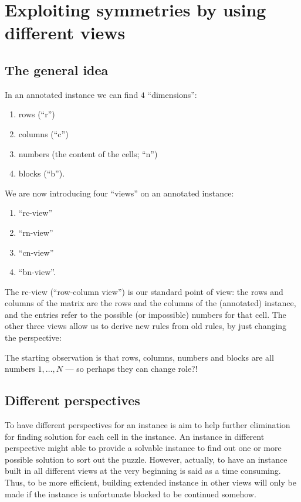 \documentclass[11pt]{report}
\begin{document}
\chapter{Exploiting symmetries by using different views}
\label{cha:exploitingsymm}


\section{The general idea}
\label{sec:diffviewsidea}

In an annotated instance we can find $4$ ``dimensions'':
\begin{enumerate}
\item rows (``r'')
\item columns (``c'')
\item numbers (the content of the cells; ``n'')
\item blocks (``b'').
\end{enumerate}
We are now introducing four ``views'' on an annotated instance:
\begin{enumerate}
\item ``rc-view''
\item ``rn-view''
\item ``cn-view''
\item ``bn-view''.
\end{enumerate}
The rc-view (``row-column view'') is our standard point of view: the rows and columns of the matrix are the rows and the columns of the (annotated) instance, and the entries refer to the possible (or impossible) numbers for that cell. The other three views allow us to derive new rules from old rules, by just changing the perspective:
\begin{center}
The starting observation is that rows, columns, numbers and blocks are all numbers $1,\dots,N$ --- so perhaps they can change role?!
\end{center}




\section{Different  perspectives}
\label{sec:Differentperspectives}

To have different perspectives for an instance is aim to help further elimination for finding solution for each cell in the instance. An instance in different perspective might able to provide a solvable instance to find out one or more possible solution to sort out the puzzle. However, actually, to have an instance built in all different views at the very beginning is said as a time consuming. Thus, to be more efficient, building extended instance in other views will only be made if the instance is unfortunate blocked to be continued somehow.
\end{document}

